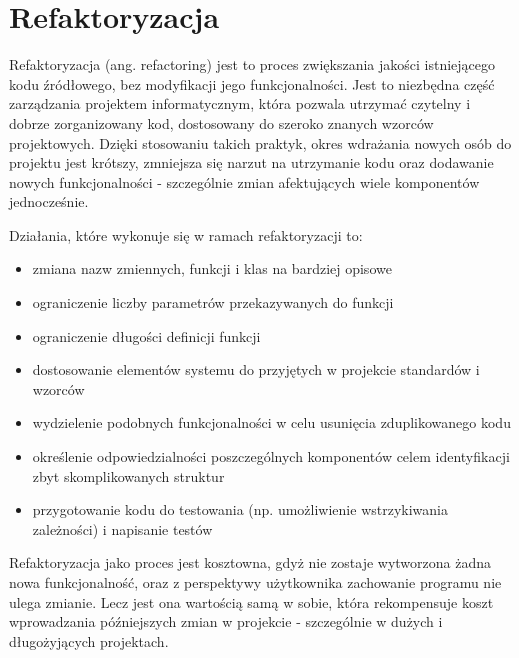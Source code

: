\section{Refaktoryzacja}
Refaktoryzacja (ang. refactoring) jest to proces zwiększania jakości istniejącego kodu źródłowego, bez modyfikacji jego funkcjonalności. Jest to niezbędna część zarządzania projektem informatycznym, która pozwala utrzymać czytelny i dobrze zorganizowany kod, dostosowany do szeroko znanych wzorców projektowych. Dzięki stosowaniu takich praktyk, okres wdrażania nowych osób do projektu jest krótszy, zmniejsza się narzut na utrzymanie kodu oraz dodawanie nowych funkcjonalności - szczególnie zmian afektujących wiele komponentów jednocześnie. 

Działania, które wykonuje się w ramach refaktoryzacji to:
\begin{itemize}
\item zmiana nazw zmiennych, funkcji i klas na bardziej opisowe
\item ograniczenie liczby parametrów przekazywanych do funkcji
\item ograniczenie długości definicji funkcji
\item dostosowanie elementów systemu do przyjętych w projekcie standardów i wzorców
\item wydzielenie podobnych funkcjonalności w celu usunięcia zduplikowanego kodu
\item określenie odpowiedzialności poszczególnych komponentów celem identyfikacji zbyt skomplikowanych struktur
\item przygotowanie kodu do testowania (np. umożliwienie wstrzykiwania zależności) i napisanie testów
\end{itemize}

Refaktoryzacja jako proces jest kosztowna, gdyż nie zostaje wytworzona żadna nowa funkcjonalność, oraz z perspektywy użytkownika zachowanie programu nie ulega zmianie. Lecz jest ona wartością samą w sobie, która rekompensuje koszt wprowadzania późniejszych zmian w projekcie - szczególnie w dużych i długożyjących projektach.



